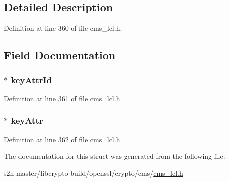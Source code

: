 \subsection{Detailed Description}


Definition at line 360 of file cms\+\_\+lcl.\+h.



\subsection{Field Documentation}
\subsubsection[{\texorpdfstring{key\+Attr\+Id}{keyAttrId}}]{$\ast$ key\+Attr\+Id}\hypertarget{struct_c_m_s___other_key_attribute__st_ad30ddc6c7aac9445327418a36ac4bd97}{}\label{struct_c_m_s___other_key_attribute__st_ad30ddc6c7aac9445327418a36ac4bd97}


Definition at line 361 of file cms\+\_\+lcl.\+h.

\subsubsection[{\texorpdfstring{key\+Attr}{keyAttr}}]{$\ast$ key\+Attr}\hypertarget{struct_c_m_s___other_key_attribute__st_a0dc51f837d35bcd9b61a183ef263427c}{}\label{struct_c_m_s___other_key_attribute__st_a0dc51f837d35bcd9b61a183ef263427c}


Definition at line 362 of file cms\+\_\+lcl.\+h.



The documentation for this struct was generated from the following file\+:\begin{DoxyCompactItemize}
\item 
s2n-\/master/libcrypto-\/build/openssl/crypto/cms/\hyperlink{cms__lcl_8h}{cms\+\_\+lcl.\+h}\end{DoxyCompactItemize}
